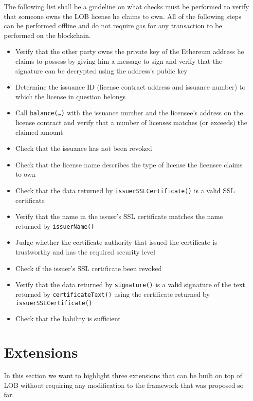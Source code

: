 \documentclass[a4paper]{article}
\begin{document}
The following list shall be a guideline on what checks must be performed to verify that someone owns the LOB license he claims to own. All of the following steps can be performed offline and do not require gas for any transaction to be performed on the blockchain.

\begin{itemize}
  \item Verify that the other party owns the private key of the Ethereum address he claims to possess by giving him a message to sign and verify that the signature can be decrypted using the address's public key
  \item Determine the issuance ID (license contract address and issuance number) to which the license in question belongs
  \item Call \texttt{balance(…)} with the issuance number and the licensee's address on the license contract and verify that a number of licenses matches (or exceeds) the claimed amount
  \item Check that the issuance has not been revoked
  \item Check that the license name describes the type of license the licensee claims to own
  \item Check that the data returned by \texttt{issuerSSLCertificate()} is a valid SSL certificate
  \item Verify that the name in the issuer's SSL certificate matches the name returned by \texttt{issuerName()}
  \item Judge whether the certificate authority that issued the certificate is trustworthy and has the required security level
  \item Check if the issuer's SSL certificate been revoked
  \item Verify that the data returned by \texttt{signature()} is a valid signature of the text returned by \texttt{certificateText()} using the certificate returned by \texttt{issuerSSLCertificate()}
  \item Check that the liability is sufficient
\end{itemize}





\section{Extensions}
\label{ch:extensions}

In this section we want to highlight three extensions that can be built on top of LOB without requiring any modification to the framework that was proposed so far.
\end{document}
